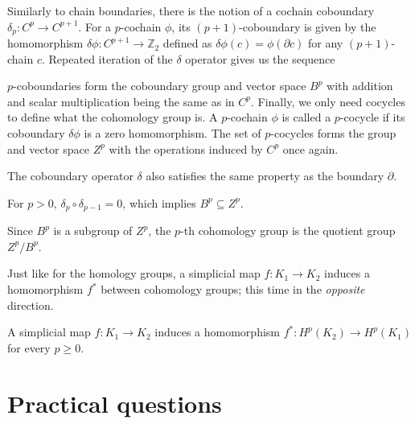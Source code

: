 Similarly to chain boundaries, there is the notion of a cochain coboundary $\delta_{p}: C^{p} \to C^{p+1}$. For a $p$-cochain $\phi$, its $(p+1)$-coboundary is given by the homomorphism $\delta \phi: C^{p+1} \to \mathbb{Z}_{2}$ defined as $\delta \phi(c) = \phi(\partial c)$ for any $(p+1)$-chain $c$. Repeated iteration of the $\delta$ operator gives us the sequence

\begin{figure}[h]
  \centering
\end{figure}

$p$-coboundaries form the coboundary group and vector space $B^{p}$ with addition and scalar multiplication being the same as in $C^{p}$. Finally, we only need cocycles to define what the cohomology group is. A $p$-cochain $\phi$ is called a $p$-cocycle if its coboundary $\delta \phi$ is a zero homomorphism. The set of $p$-cocycles forms the group and vector space $Z^{p}$ with the operations induced by $C^{p}$ once again.

The coboundary operator $\delta$ also satisfies the same property as the boundary $\partial$.

\begin{lemma}
  For $p >0$, $\delta_{p} \circ \delta_{p-1} = 0$, which implies $B^{p} \subseteq Z^{p}$.
\end{lemma}

\begin{definition}
  Since $B^{p}$ is a subgroup of $Z^{p}$, the $p$-th cohomology group is the quotient group $Z^{p} / B^{p}$.
\end{definition}

Just like for the homology groups, a simplicial map $f: K_{1} \to K_{2}$ induces a homomorphism $f^{*}$ between cohomology groups; this time in the \textit{opposite} direction.

\begin{lemma}
  A simplicial map $f: K_{1} \to K_{2}$ induces a homomorphism $f^{*}: H^{p}(K_{2}) \to H^{p}(K_{1})$ for every $p \geq 0$.
\end{lemma}

\section{Practical questions}

